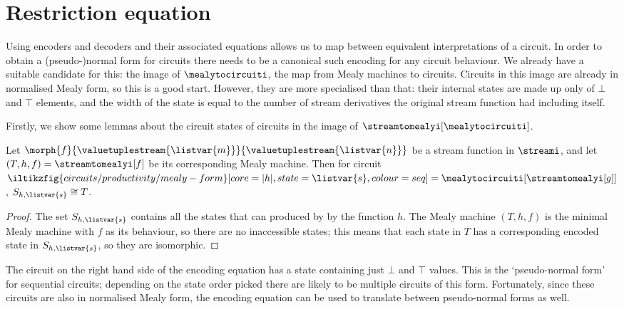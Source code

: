 \section{Restriction equation}

Using encoders and decoders and their associated equations allows us to map
between equivalent interpretations of a circuit.
In order to obtain a (pseudo-)normal form for circuits there needs to be a
canonical such encoding for any circuit behaviour.
We already have a suitable candidate for this: the image of
\(\mealytocircuiti\), the map from Mealy machines to circuits.
Circuits in this image are already in normalised Mealy form, so this is a good
start.
However, they are more specialised than that: their internal states are made up
only of \(\bot\) and \(\top\) elements, and the width of the state is equal to
the number of stream derivatives the original stream function had including
itself.

Firstly, we show some lemmas about the circuit states of circuits in the image
of \(\streamtomealyi[\mealytocircuiti]\).

\begin{lemma}\label{lem:minimal-circuit-states}
    Let \(
    \morph{f}{\valuetuplestream{\listvar{m}}}{\valuetuplestream{\listvar{n}}}
    \) be a stream function in \(\streami\), and let \(
    (T,h,f) = \streamtomealyi[f]
    \) be its corresponding Mealy machine.
    Then for circuit \(
    \iltikzfig{circuits/productivity/mealy-form}[core=|h|,state=\listvar{s},colour=seq]
    =
    \mealytocircuiti[\streamtomealyi[g]]
    \), \(S_{h,\listvar{s}} \cong T\).
\end{lemma}
\begin{proof}
    The set \(S_{h,\listvar{s}}\) contains all the states that can produced by
    by the function \(h\).
    The Mealy machine \((T,h,f)\) is the minimal Mealy machine with \(f\)
    as its behaviour, so there are no inaccessible states; this means that each
    state in \(T\) has a corresponding encoded state in \(S_{h,\listvar{s}}\),
    so they are isomorphic.
\end{proof}

\begin{example}
\end{example}



The circuit on the right hand side of the encoding equation has a state
containing just \(\bot\) and \(\top\) values.
This is the `pseudo-normal form' for sequential circuits; depending on the
state order picked there are likely to be multiple circuits of this form.
Fortunately, since these circuits are also in normalised Mealy form, the
encoding equation can be used to translate between pseudo-normal forms as well.

